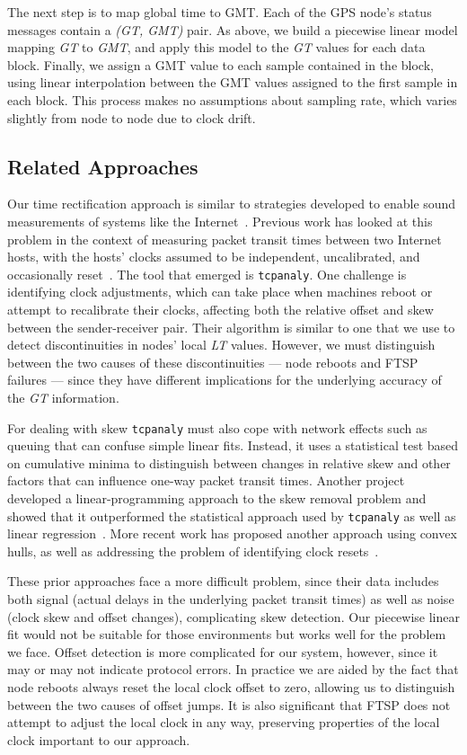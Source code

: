 The next step is to map global time to GMT. Each of the GPS node's status
messages contain a \textit{(GT, GMT)} pair. As above, we build a piecewise
linear model mapping \textit{GT} to \textit{GMT}, and apply this model to the
\textit{GT} values for each data block. Finally, we assign a GMT value to
each sample contained in the block, using linear interpolation between the
GMT values assigned to the first sample in each block. This process makes no
assumptions about sampling rate, which varies slightly from node to node due
to clock drift.

\subsection{Related Approaches}

Our time rectification approach is similar to strategies developed to enable
sound measurements of systems like the Internet~\cite{paxson-imc04}. Previous
work has looked at this problem in the context of measuring packet transit
times between two Internet hosts, with the hosts' clocks assumed to be
independent, uncalibrated, and occasionally reset~\cite{paxson-sigmetrics98}.
The tool that emerged is \texttt{tcpanaly}. One challenge is identifying
clock adjustments, which can take place when machines reboot or attempt to
recalibrate their clocks, affecting both the relative offset and skew between
the sender-receiver pair. Their algorithm is similar to one that we use to
detect discontinuities in nodes' local \textit{LT} values. However, we must
distinguish between the two causes of these discontinuities --- node reboots
and FTSP failures --- since they have different implications for the
underlying accuracy of the \textit{GT} information.

For dealing with skew \texttt{tcpanaly} must also cope with network effects
such as queuing that can confuse simple linear fits. Instead, it uses a
statistical test based on cumulative minima to distinguish between changes in
relative skew and other factors that can influence one-way packet transit
times. Another project developed a linear-programming approach to the skew
removal problem and showed that it outperformed the statistical approach used
by \texttt{tcpanaly} as well as linear regression~\cite{moon-mittechreport}.
More recent work has proposed another approach using convex hulls, as well as
addressing the problem of identifying clock resets~\cite{zhang-infocom02}.

These prior approaches face a more difficult problem, since their data
includes both signal (actual delays in the underlying packet transit times)
as well as noise (clock skew and offset changes), complicating skew
detection. Our piecewise linear fit would not be suitable for those
environments but works well for the problem we face. Offset detection is more
complicated for our system, however, since it may or may not indicate
protocol errors. In practice we are aided by the fact that node reboots
always reset the local clock offset to zero, allowing us to distinguish
between the two causes of offset jumps. It is also significant that FTSP does
not attempt to adjust the local clock in any way, preserving properties of
the local clock important to our approach.

